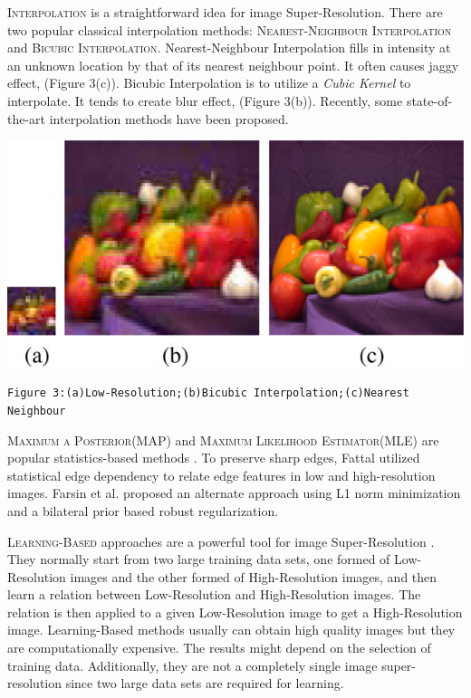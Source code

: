 \documentclass[12pt]{article}
\begin{document}
			\textsc{Interpolation} is a straightforward idea for image Super-Resolution. There are two popular classical interpolation methods: \textsc{Nearest-Neighbour Interpolation} and \textsc{Bicubic Interpolation}. Nearest-Neighbour Interpolation fills in intensity at an unknown location by that of its nearest neighbour point. It often causes jaggy effect, (Figure 3(c)). Bicubic Interpolation is to utilize a \textit{Cubic Kernel} to interpolate. It tends to create blur effect, (Figure 3(b)). Recently, some state-of-the-art interpolation methods have been proposed.
			\begin{center}
				\vspace{0.1in}
				\includegraphics[width=6in]{Images/BiCubicVSNN.jpg}
				
				\texttt{Figure 3:(a)Low-Resolution;(b)Bicubic Interpolation;(c)Nearest Neighbour}
				\vspace{0.1in}
			\end{center}
			
			\textsc{Maximum a Posterior}(MAP) and \textsc{Maximum Likelihood Estimator}(MLE) are popular statistics-based methods \cite{2}\cite{3}. To preserve sharp edges, Fattal \cite{2} utilized statistical edge dependency to relate edge features in low and high-resolution images. Farsin et al. \cite{3} proposed an alternate approach using L1 norm minimization and a bilateral prior based robust regularization.
			
			\textsc{Learning-Based} approaches are a powerful tool for image Super-Resolution \cite{4}\cite{5}. They normally start from two large training data sets, one formed of Low-Resolution images and the other formed of High-Resolution images, and then learn a relation between Low-Resolution and High-Resolution images. The relation is then applied to a given Low-Resolution image to get a High-Resolution image. Learning-Based methods usually can obtain high quality images but they are computationally expensive. The results might depend on the selection of training data. Additionally, they are not a completely single image super-resolution since two large data sets are required for learning.
			
\end{document}
